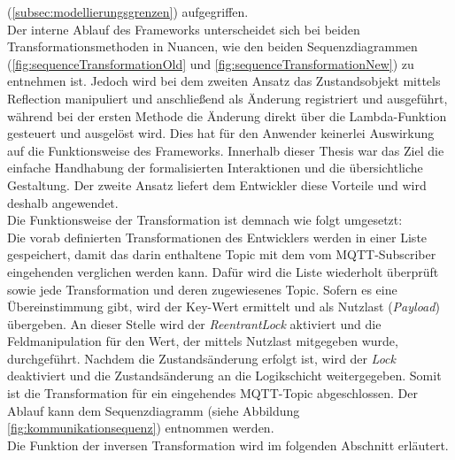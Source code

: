     (\ref{subsec:modellierungsgrenzen}) aufgegriffen. 
    \\
    Der interne Ablauf des Frameworks unterscheidet sich bei beiden Transformationsmethoden in Nuancen, wie den beiden Sequenzdiagrammen 
    (\ref{fig:sequenceTransformationOld} und \ref{fig:sequenceTransformationNew}) zu entnehmen ist. Jedoch wird bei dem zweiten Ansatz 
    das Zustandsobjekt mittels Reflection manipuliert und anschließend als Änderung registriert und ausgeführt, während bei der ersten Methode 
    die Änderung direkt über die Lambda-Funktion gesteuert und ausgelöst wird. Dies hat für den Anwender keinerlei Auswirkung auf die 
    Funktionsweise des Frameworks. Innerhalb dieser Thesis war das Ziel die einfache Handhabung der formalisierten Interaktionen und 
    die übersichtliche Gestaltung. Der zweite Ansatz liefert dem Entwickler diese Vorteile und wird deshalb angewendet. 
    \\
    \linebreak
    Die Funktionsweise der Transformation ist demnach wie folgt umgesetzt:
    \\
    Die vorab definierten Transformationen des Entwicklers werden in einer Liste gespeichert, damit das darin enthaltene Topic mit dem vom \acs{MQTT}-Subscriber eingehenden 
    verglichen werden kann. Dafür wird die Liste wiederholt überprüft sowie jede Transformation und deren zugewiesenes Topic. Sofern 
    es eine Übereinstimmung gibt, wird der Key-Wert ermittelt und als Nutzlast (\textit{Payload}) übergeben. An dieser Stelle wird der \textit{ReentrantLock} aktiviert 
    und die Feldmanipulation für den Wert, der mittels Nutzlast mitgegeben wurde, durchgeführt. Nachdem die Zustandsänderung erfolgt ist, wird der \textit{Lock} deaktiviert und 
    die Zustandsänderung an die Logikschicht weitergegeben. Somit ist die Transformation für ein eingehendes \acs{MQTT}-Topic abgeschlossen. 
    Der Ablauf kann dem Sequenzdiagramm (siehe Abbildung \ref{fig:kommunikationsequenz}) entnommen werden.  
    \\
    Die Funktion der inversen Transformation wird im folgenden Abschnitt erläutert.

